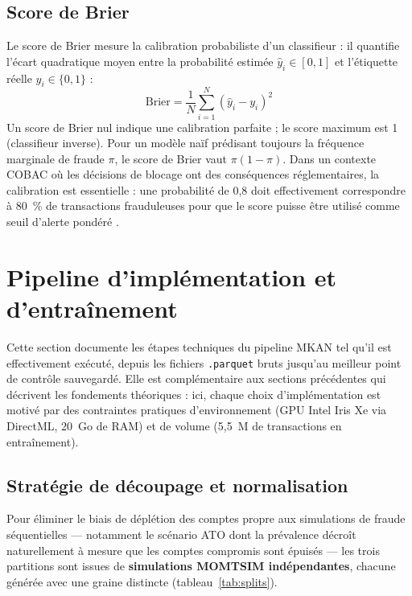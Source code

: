 \documentclass[11pt,a4paper,oneside]{report}
\theoremstyle{definition}
\theoremstyle{remark}
\begin{document}
\subsection{Score de Brier}
\label{subsec:brier}

Le score de Brier mesure la calibration probabiliste d'un classifieur : il quantifie l'écart quadratique moyen entre la probabilité estimée $\hat{y}_i \in [0,1]$ et l'étiquette réelle $y_i \in \{0,1\}$ :
\begin{equation}
    \text{Brier} = \frac{1}{N}\sum_{i=1}^{N}\left(\hat{y}_i - y_i\right)^2
    \label{eq:brier}
\end{equation}
Un score de Brier nul indique une calibration parfaite ; le score maximum est 1 (classifieur inverse). Pour un modèle naïf prédisant toujours la fréquence marginale de fraude $\pi$, le score de Brier vaut $\pi(1-\pi)$. Dans un contexte COBAC où les décisions de blocage ont des conséquences réglementaires, la calibration est essentielle : une probabilité de 0,8 doit effectivement correspondre à 80~\% de transactions frauduleuses pour que le score puisse être utilisé comme seuil d'alerte pondéré \citep{gsma2024fraud}.

\section{Pipeline d'implémentation et d'entraînement}
\label{sec:pipeline}

Cette section documente les étapes techniques du pipeline MKAN tel qu'il est effectivement exécuté, depuis les fichiers \texttt{.parquet} bruts jusqu'au meilleur point de contrôle sauvegardé. Elle est complémentaire aux sections précédentes qui décrivent les fondements théoriques : ici, chaque choix d'implémentation est motivé par des contraintes pratiques d'environnement (GPU Intel Iris Xe via DirectML, 20~Go de RAM) et de volume (5,5~M de transactions en entraînement).

\subsection{Stratégie de découpage et normalisation}
\label{subsec:split}

Pour éliminer le biais de déplétion des comptes propre aux simulations de fraude séquentielles --- notamment le scénario ATO dont la prévalence décroît naturellement à mesure que les comptes compromis sont épuisés --- les trois partitions sont issues de \textbf{simulations MOMTSIM indépendantes}, chacune générée avec une graine distincte (tableau~\ref{tab:splits}).
\end{document}
